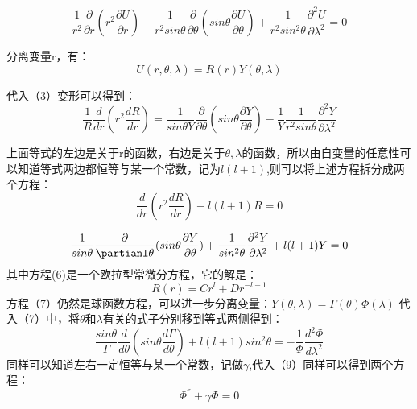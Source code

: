 \documentclass{article}
\begin{document}
    \begin{equation}
        \frac{1}{r^{2}}\frac{\partial}{\partial{r}}(r^2\frac{\partial{U}}{\partial{r}})+\frac{1}{r^2sin\theta}\frac{\partial}{\partial\theta}(sin\theta\frac{\partial{U}}{\partial\theta}) + \frac{1}{r^2sin^2\theta}\frac{\partial^{2}U}{\partial{\lambda}^2}=0
   \end{equation}
   
分离变量r，有：
     \begin{equation} 
      U(r,\theta,\lambda) = R(r)Y(\theta, \lambda)
   \end{equation}
   
代入（3）变形可以得到：
\begin{equation} 
      \frac{1}{R}\frac{d}{dr}(r^2\frac{dR}{dr}) = \frac{1}{sin\theta{Y}}\frac{\partial}{\partial\theta}(sin\theta\frac{\partial{Y}}{\partial{\theta}})-\frac{1}{Y}\frac{1}{r^2sin\theta}\frac{\partial^2Y}{\partial\lambda^2}   
   \end{equation}
   
 上面等式的左边是关于r的函数，右边是关于$\theta,\lambda$的函数，所以由自变量的任意性可以知道等式两边都恒等与某一个常数，记为$l(l+1)$,则可以将上述方程拆分成两个方程：
 \begin{equation}
         \frac{d}{dr}(r^2\frac{dR}{dr})-l(l+1)R=0      
 \end{equation}
 
 \begin{equation}
        \frac{1}{sin\theta}\frac{\partial}{\partianl\theta}(sin\theta\frac{\partial{Y}}{\partial\theta})+\frac{1}{sin^2\theta}\frac{\partial^2Y}{\partial\lambda^2}+l(l+1)Y=0
 \end{equation}
 其中方程(6)是一个欧拉型常微分方程，它的解是：
  \begin{equation}
      R(r)=Cr^{l} + Dr^{-l-1}
  \end{equation}
  方程（7）仍然是球函数方程，可以进一步分离变量：$Y(\theta,\lambda)=\Gamma(\theta)\Phi(\lambda)$
 代入（7）中，将$\theta$和$\lambda$有关的式子分别移到等式两侧得到：
 \begin{equation}
     \frac{sin\theta}{\Gamma}\frac{d}{d\theta}(sin\theta\frac{d\Gamma}{d\theta})+l(l+1)sin^2\theta=-\frac{1}{\Phi}\frac{d^2\Phi}{d\lambda^2}
 \end{equation}
 同样可以知道左右一定恒等与某一个常数，记做$\gamma$,代入（9）同样可以得到两个方程：
\begin{equation}
    \Phi^{''} + \gamma\Phi = 0
\end{equation}
\end{document}
